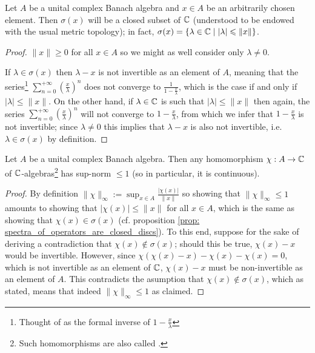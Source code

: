             \begin{proposition} \label{prop: spectra_of_operators_are_closed_discs}
                Let $A$ be a unital complex Banach algebra and $x \in A$ be an arbitrarily chosen element. Then $\sigma(x)$ will be a closed subset of $\mathbb{C}$ (understood to be endowed with the usual metric topology); in fact, $\sigma(x) = \{\lambda \in \mathbb{C} \mid |\lambda| \leqslant \|x\|\}$.
            \end{proposition}
                \begin{proof}
                    $\|x\| \geq 0$ for all $x \in A$ so we might as well consider only $\lambda \not = 0$.
                    
                    If $\lambda \in \sigma(x)$ then $\lambda - x$ is not invertible as an element of $A$, meaning that the series\footnote{Thought of as the formal inverse of $1 - \frac{x}{\lambda}$} $\sum_{n = 0}^{+\infty} \left(\frac{x}{\lambda}\right)^n$ does not converge to $\frac{1}{1 - \frac{x}{\lambda}}$, which is the case if and only if $|\lambda| \leq \|x\|$. On the other hand, if $\lambda \in \mathbb{C}$ is such that $|\lambda| \leq \|x\|$ then again, the series $\sum_{n = 0}^{+\infty} \left(\frac{x}{\lambda}\right)^n$ will not converge to $1 - \frac{x}{\lambda}$, from which we infer that $1 - \frac{x}{\lambda}$ is not invertible; since $\lambda \not = 0$ this implies that $\lambda - x$ is also not invertible, i.e. $\lambda \in \sigma(x)$ by definition. 
                \end{proof}
            \begin{corollary} \label{coro: characters_of_unital_complex_banach_algebras_are_continuous}
                Let $A$ be a unital complex Banach algebra. Then any homomorphism $\chi: A \to \mathbb{C}$ of $\mathbb{C}$-algebras\footnote{Such homomorphisms are also called .} has sup-norm $\leq 1$ (so in particular, it is continuous).
            \end{corollary}
                \begin{proof}
                    By definition $\|\chi\|_{\infty} := \sup_{x \in A} \frac{|\chi(x)|}{\|x\|}$ so showing that $\|\chi\|_{\infty} \leq 1$ amounts to showing that $|\chi(x)| \leq \|x\|$ for all $x \in A$, which is the same as showing that $\chi(x) \in \sigma(x)$ (cf. proposition \ref{prop: spectra_of_operators_are_closed_discs}). To this end, suppose for the sake of deriving a contradiction that $\chi(x) \not \in \sigma(x)$; should this be true, $\chi(x) - x$ would be invertible. However, since $\chi(\chi(x) - x) - \chi(x) - \chi(x) = 0$, which is not invertible as an element of $\mathbb{C}$, $\chi(x) - x$ must be non-invertible as an element of $A$. This contradicts the asumption that $\chi(x) \not \in \sigma(x)$, which as stated, means that indeed $\|\chi\|_{\infty} \leq 1$ as claimed.
                \end{proof}
